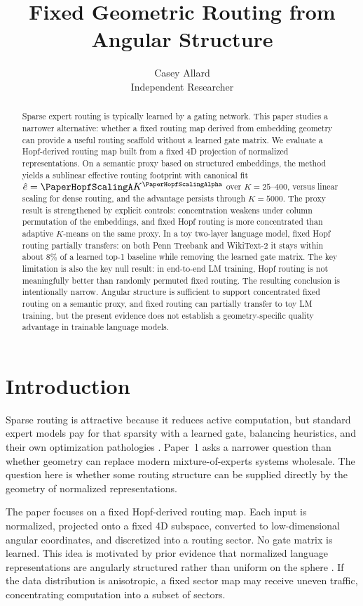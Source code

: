 \documentclass[10pt,twocolumn]{article}
\title{\textbf{Fixed Geometric Routing from Angular Structure}}
\author{Casey Allard\\Independent Researcher}
\date{}
\begin{document}
\maketitle

\begin{abstract}
Sparse expert routing is typically learned by a gating network. This paper studies a narrower alternative: whether a fixed routing map derived from embedding geometry can provide a useful routing scaffold without a learned gate matrix. We evaluate a Hopf-derived routing map built from a fixed 4D projection of normalized representations. On a semantic proxy based on structured embeddings, the method yields a sublinear effective routing footprint with canonical fit $\hat{e}=\PaperHopfScalingA K^{\PaperHopfScalingAlpha}$ over $K=25$--$400$, versus linear scaling for dense routing, and the advantage persists through $K=5000$. The proxy result is strengthened by explicit controls: concentration weakens under column permutation of the embeddings, and fixed Hopf routing is more concentrated than adaptive $K$-means on the same proxy. In a toy two-layer language model, fixed Hopf routing partially transfers: on both Penn Treebank and WikiText-2 it stays within about $8\%$ of a learned top-1 baseline while removing the learned gate matrix. The key limitation is also the key null result: in end-to-end LM training, Hopf routing is not meaningfully better than randomly permuted fixed routing. The resulting conclusion is intentionally narrow. Angular structure is sufficient to support concentrated fixed routing on a semantic proxy, and fixed routing can partially transfer to toy LM training, but the present evidence does not establish a geometry-specific quality advantage in trainable language models.
\end{abstract}

\section{Introduction}
Sparse routing is attractive because it reduces active computation, but standard expert models pay for that sparsity with a learned gate, balancing heuristics, and their own optimization pathologies \citep{shazeer2017outrageously,fedus2022switch}. Paper~1 asks a narrower question than whether geometry can replace modern mixture-of-experts systems wholesale. The question here is whether some routing structure can be supplied directly by the geometry of normalized representations.

The paper focuses on a fixed Hopf-derived routing map. Each input is normalized, projected onto a fixed 4D subspace, converted to low-dimensional angular coordinates, and discretized into a routing sector. No gate matrix is learned. This idea is motivated by prior evidence that normalized language representations are angularly structured rather than uniform on the sphere \citep{turboquant2026}. If the data distribution is anisotropic, a fixed sector map may receive uneven traffic, concentrating computation into a subset of sectors.
\end{document}
